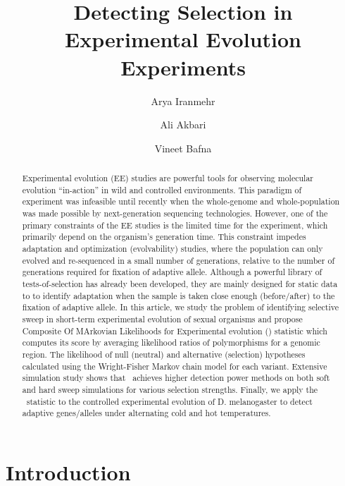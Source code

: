 \documentclass[11pt]{article}
\title{Detecting Selection in Experimental Evolution Experiments}
\author[1]{Arya Iranmehr}
\author[1]{Ali Akbari}
\author[2]{Vineet Bafna}
\affil[1]{\footnotesize Electrical and Computer Engineering, University of California, San Diego, La Jolla, CA 92093, USA.}
\affil[2]{\footnotesize Computer Science \& Engineering, University of California, San Diego, La Jolla, CA 92093, USA}
\date{}
\def\comale{\text{COMALE }}
\begin{document}
\maketitle
\begin{abstract}
  Experimental evolution (EE) studies are powerful tools for observing
  molecular evolution ``in-action'' in wild and controlled
  environments. This paradigm of experiment was infeasible until
  recently when the whole-genome and whole-population was made
  possible by next-generation sequencing technologies.  However, one
  of the primary constraints of the EE studies is the limited time for
  the experiment, which primarily depend on the organism's generation
  time. This constraint impedes adaptation and optimization
  (evolvability) studies, where the population can only evolved and
  re-sequenced in a small number of generations, relative to the
  number of generations required for fixation of adaptive allele.
  Although a powerful library of tests-of-selection has already been
  developed, they are mainly designed for static data to to identify
  adaptation when the sample is taken close enough (before/after) to
  the fixation of adaptive allele.  In this article, we study the
  problem of identifying selective sweep in short-term experimental
  evolution of sexual organisms and propose Composite Of MArkovian
  Likelihoods for Experimental evolution (\comale) statistic which
  computes its score by averaging likelihood ratios of polymorphisms
  for a genomic region.  The likelihood of null (neutral) and
  alternative (selection) hypotheses calculated using the
  Wright-Fisher Markov chain model for each variant. Extensive
  simulation study shows that \comale\ achieves higher detection power
  methods on both soft and hard sweep simulations for various
  selection strengths.  Finally, we apply the \comale\ statistic to
  the controlled experimental evolution of D. melanogaster to detect
  adaptive genes/alleles under alternating cold and hot temperatures.
\end{abstract}



\section{Introduction}
\end{document}
